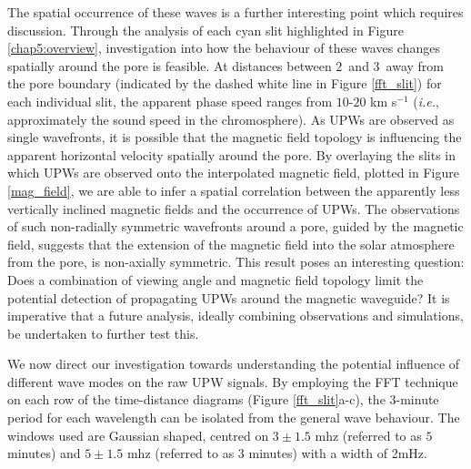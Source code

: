 	The spatial occurrence of these waves is a further interesting point which requires discussion.
	Through the analysis of each cyan slit highlighted in Figure \ref{chap5:overview}, investigation into how the behaviour of these waves changes spatially around the pore is feasible.
	At distances between $2$\arcsecs\ and $3$\arcsecs\ away from the pore boundary (indicated by the dashed white line in Figure \ref{fft_slit}) for each individual slit, the apparent phase speed ranges from $10$-$20$ km s$^{-1}$ (\textit{i.e.}, approximately the sound speed in the chromosphere).
	As UPWs are observed as single wavefronts, it is possible that the magnetic field topology is influencing the apparent horizontal velocity spatially around the pore.
	By overlaying the slits in which UPWs are observed onto the interpolated magnetic field, plotted in Figure \ref{mag_field}, we are able to infer a spatial correlation between the apparently less vertically inclined magnetic fields and the occurrence of UPWs.
	The observations of such non-radially symmetric wavefronts around a pore, guided by the magnetic field, suggests that the extension of the magnetic field into the solar atmosphere from the pore, is non-axially symmetric.
	This result poses an interesting question: Does a combination of viewing angle and magnetic field topology limit the potential detection of propagating UPWs around the magnetic waveguide?
	It is imperative that a future analysis, ideally combining observations and simulations, be undertaken to further test this.

    We now direct our investigation towards understanding the potential influence of different wave modes on the raw UPW signals.
	By employing the FFT technique on each row of the time-distance diagrams (Figure \ref{fft_slit}a-c), the $3$-minute period for each wavelength can be isolated from the general wave behaviour.
	The windows used are Gaussian shaped, centred on $3\pm1.5$ mhz (referred to as $5$ minutes) and $5\pm1.5$ mhz (referred to as $3$ minutes) with a width of 2mHz.

